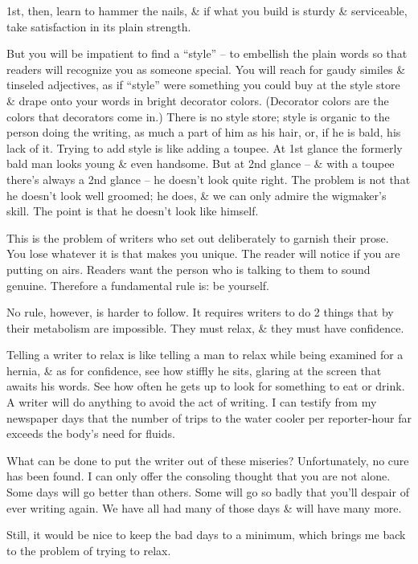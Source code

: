 \documentclass{article}
\begin{document}
1st, then, learn to hammer the nails, \& if what you build is sturdy \& serviceable, take satisfaction in its plain strength.

But you will be impatient to find a ``style'' -- to embellish the plain words so that readers will recognize you as someone special. You will reach for gaudy similes \& tinseled adjectives, as if ``style'' were something you could buy at the style store \& drape onto your words in bright decorator colors. (Decorator colors are the colors that decorators come in.) There is no style store; style is organic to the person doing the writing, as much a part of him as his hair, or, if he is bald, his lack of it. Trying to add style is like adding a toupee. At 1st glance the formerly bald man looks young \& even handsome. But at 2nd glance -- \& with a toupee there's always a 2nd glance -- he doesn't look quite right. The problem is not that he doesn't look well groomed; he does, \& we can only admire the wigmaker's skill. The point is that he doesn't look like himself.

This is the problem of writers who set out deliberately to garnish their prose. You lose whatever it is that makes you unique. The reader will notice if you are putting on airs. Readers want the person who is talking to them to sound genuine. Therefore a fundamental rule is: be yourself.

No rule, however, is harder to follow. It requires writers to do 2 things that by their metabolism are impossible. They must relax, \& they must have confidence.

Telling a writer to relax is like telling a man to relax while being examined for a hernia, \& as for confidence, see how stiffly he sits, glaring at the screen that awaits his words. See how often he gets up to look for something to eat or drink. A writer will do anything to avoid the act of writing. I can testify from my newspaper days that the number of trips to the water cooler per reporter-hour far exceeds the body's need for fluids.

What can be done to put the writer out of these miseries? Unfortunately, no cure has been found. I can only offer the consoling thought that you are not alone. Some days will go better than others. Some will go so badly that you'll despair of ever writing again. We have all had many of those days \& will have many more.

Still, it would be nice to keep the bad days to a minimum, which brings me back to the problem of trying to relax.
\end{document}
